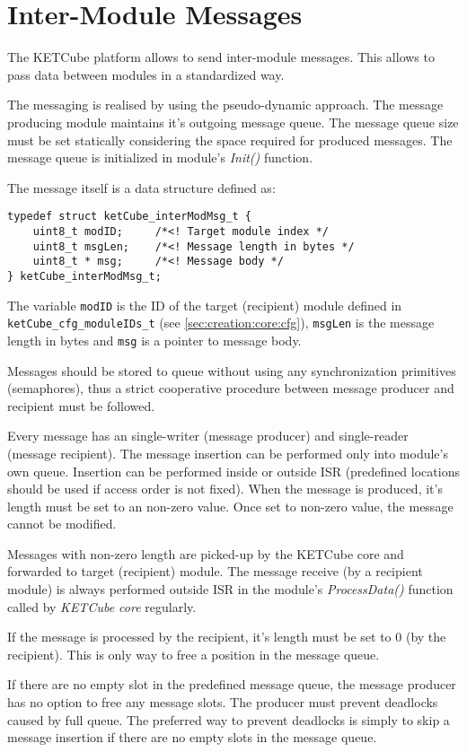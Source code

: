 \documentclass[twoside,a4paper]{refart}
\begin{document}
\clearpage
\section{Inter-Module Messages}\label{sec:msg}
The KETCube platform allows to send inter-module messages. This allows to pass data between modules in a standardized way.

The messaging is realised by using the pseudo-dynamic approach. The message producing module  maintains it's outgoing message queue. The message queue size must be set statically considering the space required for produced messages. The message queue is initialized in module's {\it Init()} function.

The message itself is a data structure defined as:
\begin{verbatim}
typedef struct ketCube_interModMsg_t {
    uint8_t modID;     /*<! Target module index */
    uint8_t msgLen;    /*<! Message length in bytes */
    uint8_t * msg;     /*<! Message body */
} ketCube_interModMsg_t;
\end{verbatim}

The variable {\tt modID} is the ID of the target (recipient) module defined in {\tt ketCube\_cfg\_moduleIDs\_t} (see \ref{sec:creation:core:cfg}), {\tt msgLen} is the message length in bytes and {\tt *msg} is a pointer to message body.

Messages should be stored to queue without using any synchronization primitives (semaphores), thus a strict cooperative procedure between message producer and recipient must be followed. 

Every message has an single-writer (message producer) and single-reader (message recipient). The message insertion can be performed only into module's own queue. Insertion can be performed inside or outside ISR (predefined locations should be used if access order is not fixed). When the message is produced, it's length must be set to an non-zero value. Once set to non-zero value, the message cannot be modified.

Messages with non-zero length are picked-up by the KETCube core and forwarded to target (recipient) module. The message receive (by a recipient module) is always performed outside ISR in the module's {\it ProcessData()} function called by {\it KETCube core} regularly.

If the message is processed by the recipient, it's length must be set to 0 (by the recipient). This is only way to free a position in the message queue.

If there are no empty slot in the predefined message queue, the message producer has no option to free any message slots. The producer must prevent deadlocks caused by full queue. The preferred way to prevent deadlocks is simply to skip a message insertion if there are no empty slots in the message queue.



\clearpage





\end{document}
